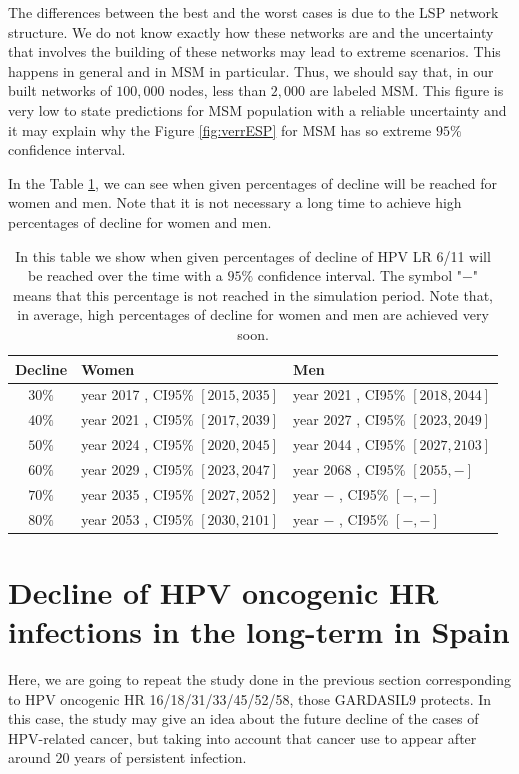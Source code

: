 The differences between the best and the worst cases is due to the LSP network structure. We do not know exactly how these networks are and the uncertainty that involves the building of these networks may lead to extreme scenarios. This happens in general and in MSM in particular. Thus, we should say that, in our built networks of $100,000$ nodes, less than $2,000$ are labeled MSM. This figure is very low to state predictions for MSM population with a reliable uncertainty and it may explain why the Figure \ref{fig:verrESP} for MSM has so extreme $95\%$ confidence interval.

In the Table \ref{tabla:verrESP}, we can see when given percentages of decline will be reached for women and men. Note that it is not necessary a long time to achieve high percentages of decline for women and men.

\begin{table}[!h]
\centering
\begin{tabular}{c|ll}
	Decline & Women & Men  \\ 
	\hline 
$ 30 \%$ & year  2017 , CI95\% $[ 2015 , 2035 ]$ & year  2021 , CI95\% $[ 2018 , 2044 ]$  \\
$ 40 \%$ & year  2021 , CI95\% $[ 2017 , 2039 ]$ & year  2027 , CI95\% $[ 2023 , 2049 ]$  \\	
$ 50 \%$ & year  2024 , CI95\% $[ 2020 , 2045 ]$ & year  2044 , CI95\% $[ 2027 , 2103 ]$  \\
$ 60 \%$ & year  2029 , CI95\% $[ 2023 , 2047 ]$ & year  2068 , CI95\% $[ 2055 , - ]$  \\
$ 70 \%$ & year  2035 , CI95\% $[ 2027 , 2052 ]$ & year  $-$ , CI95\% $[ - , - ]$  \\
$ 80 \%$ & year  2053 , CI95\% $[ 2030 , 2101 ]$ & year  $-$ , CI95\% $[ - , - ]$  \\
\end{tabular} 
\caption{In this table we show when given percentages of decline of HPV LR 6/11 will be reached over the time with a $95\%$ confidence interval. The symbol "$-$" means that this percentage is not reached in the simulation period. Note that, in average, high percentages of decline for women and men are achieved very soon.}
\label{tabla:verrESP}
\end{table}

\section{Decline of HPV oncogenic HR infections in the long-term in Spain}
Here, we are going to repeat the study done in the previous section corresponding to HPV oncogenic HR 16/18/31/33/45/52/58, those GARDASIL9 protects. In this case, the study may give an idea about the future decline of the cases of HPV-related cancer, but taking into account that cancer use to appear after around $20$ years of persistent infection. 

